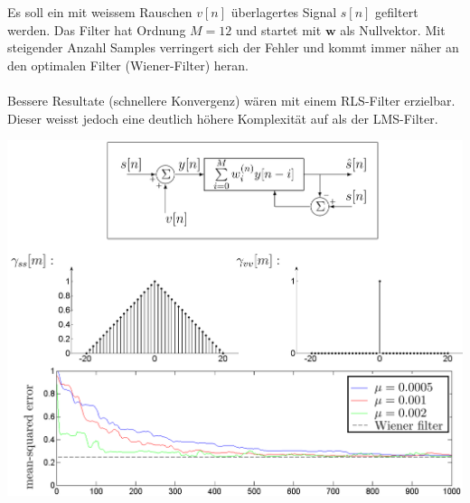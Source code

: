 Es soll ein mit weissem Rauschen $v[n]$ überlagertes Signal $s[n]$ gefiltert werden. Das Filter
hat Ordnung $M=12$ und startet mit $\textbf{w}$ als Nullvektor. Mit steigender Anzahl Samples 
verringert sich der Fehler und kommt immer näher an den optimalen Filter (Wiener-Filter) heran.\\\\
Bessere Resultate (schnellere Konvergenz) wären mit einem RLS-Filter erzielbar. 
Dieser weisst jedoch eine deutlich höhere Komplexität auf als der LMS-Filter.
\begin{center}
	\includegraphics[width=.7\textwidth]{../fig/lms_algorithm}
\end{center}
\newpage

